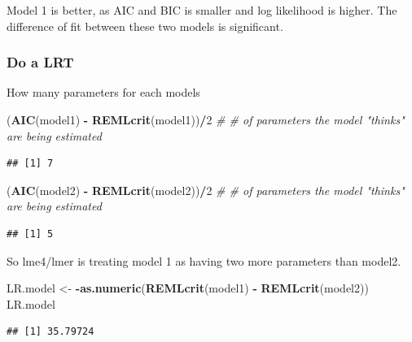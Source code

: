 \documentclass[
]{article}
\newenvironment{Shaded}{\begin{snugshade}}{\end{snugshade}}
\newcommand{\CommentTok}[1]{\textcolor[rgb]{0.56,0.35,0.01}{\textit{#1}}}
\newcommand{\DecValTok}[1]{\textcolor[rgb]{0.00,0.00,0.81}{#1}}
\newcommand{\KeywordTok}[1]{\textcolor[rgb]{0.13,0.29,0.53}{\textbf{#1}}}
\newcommand{\NormalTok}[1]{#1}
\newcommand{\OperatorTok}[1]{\textcolor[rgb]{0.81,0.36,0.00}{\textbf{#1}}}
\newcommand{\StringTok}[1]{\textcolor[rgb]{0.31,0.60,0.02}{#1}}
\begin{document}
Model 1 is better, as AIC and BIC is smaller and log likelihood is
higher. The difference of fit between these two models is significant.

\hypertarget{do-a-lrt}{%
\subsubsection{Do a LRT}\label{do-a-lrt}}

How many parameters for each models

\begin{Shaded}
\begin{Highlighting}[]
\NormalTok{(}\KeywordTok{AIC}\NormalTok{(model1) }\OperatorTok{-}\StringTok{ }\KeywordTok{REMLcrit}\NormalTok{(model1))}\OperatorTok{/}\DecValTok{2} \CommentTok{# # of parameters the model "thinks" are being estimated}
\end{Highlighting}
\end{Shaded}

\begin{verbatim}
## [1] 7
\end{verbatim}

\begin{Shaded}
\begin{Highlighting}[]
\NormalTok{(}\KeywordTok{AIC}\NormalTok{(model2) }\OperatorTok{-}\StringTok{ }\KeywordTok{REMLcrit}\NormalTok{(model2))}\OperatorTok{/}\DecValTok{2} \CommentTok{# # of parameters the model "thinks" are being estimated}
\end{Highlighting}
\end{Shaded}

\begin{verbatim}
## [1] 5
\end{verbatim}

So lme4/lmer is treating model 1 as having two more parameters than
model2.

\begin{Shaded}
\begin{Highlighting}[]
\NormalTok{LR.model <-}\StringTok{  }\OperatorTok{-}\KeywordTok{as.numeric}\NormalTok{(}\KeywordTok{REMLcrit}\NormalTok{(model1) }\OperatorTok{-}\StringTok{ }\KeywordTok{REMLcrit}\NormalTok{(model2))}
\NormalTok{LR.model}
\end{Highlighting}
\end{Shaded}

\begin{verbatim}
## [1] 35.79724
\end{verbatim}
\end{document}
